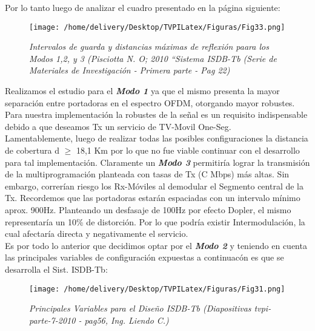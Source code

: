 \documentclass[a4paper,11pt]{article} %
\begin{document}
Por lo tanto luego de analizar el cuadro presentado en la p\'agina
siguiente:

\begin{figure}[h!] 
\centering
\texttt{[image: /home/delivery/Desktop/TVPILatex/Figuras/Fig33.png]}
\caption{\emph{Intervalos de guarda y distancias m\'aximas de
reflexi\'on paara los Modos 1,2, y 3 (Pisciotta N. O; 2010 {``}Sistema
ISDB-Tb (Serie de Materiales de Investigaci\'on - Primera parte - Pag
22)}}
\end{figure}

\begin{center}
\color{white}{.}
\end{center}
\newpage

Realizamos el estudio para el \textbf{\emph{Modo 1}} ya que el mismo
presenta la mayor separaci\'on entre portadoras en el espectro OFDM,
otorgando mayor robustes. Para nuestra implementaci\'on la robustes de
la se\~nal es un requisito indispensable debido a que deseamos Tx un
servicio de TV-Movil One-Seg.
\\
 
Lamentablemente, luego de realizar todas las posibles configuraciones
la distancia de cobertura d $\ge$ 18,1 Km por lo que no fue viable
continuar con el desarrollo para tal implementaci\'on.
Claramente un \textbf{\emph{Modo 3}} permitir\'ia lograr la
transmisi\'on de la multiprogramación planteada con tasas de Tx (C
Mbps) m\'as altas. Sin embargo, correr\'ian riesgo los Rx-M\'oviles al
demodular el Segmento central de la Tx. Recordemos que las portadoras
estar\'an espaciadas con un intervalo m\'inimo aprox. 900Hz. Planteando
un desfasaje de 100Hz por efecto Dopler, el mismo representar\'ia un
10\% de distorci\'on. Por lo que podr\'ia existir Intermodulaci\'on, la
cual afectar\'ia directa y negativamente el servicio.
\\

Es por todo lo anterior que decidimos optar por el \textbf{\emph{Modo
2}} y teniendo en cuenta las principales variables de configuraci\'on
expuestas a continuac\'on es que se desarrolla el Sist. ISDB-Tb:
 

\begin{figure}[h!] 
\centering
\texttt{[image: /home/delivery/Desktop/TVPILatex/Figuras/Fig31.png]}
\caption{\emph{Principales Variables para el Dise\~no ISDB-Tb
(Diapositivas tvpi-parte-7-2010 - pag56, Ing. Liendo C.)}}
\end{figure}
\end{document}
